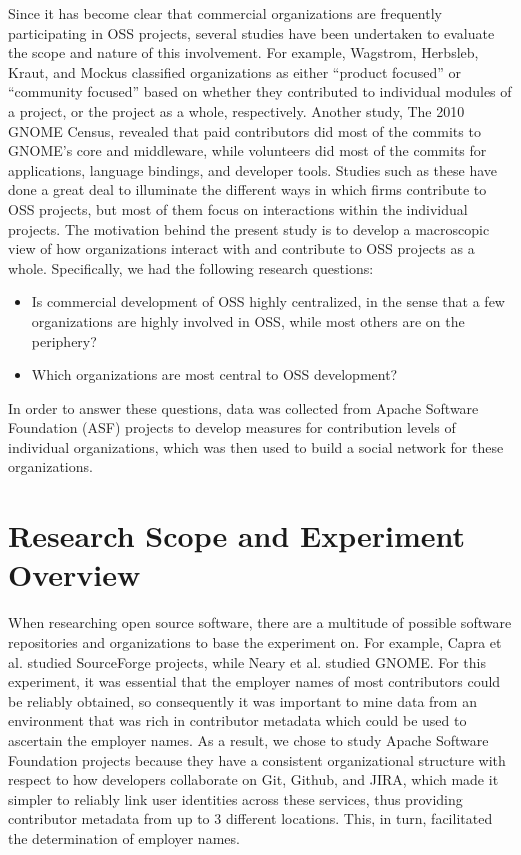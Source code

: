 Since it has become clear that commercial organizations are frequently participating in OSS projects, several studies have been undertaken to evaluate the scope and nature of this involvement. For example, Wagstrom, Herbsleb, Kraut, and Mockus \cite{wagstrom2010impact} classified organizations as either ``product focused'' or ``community focused'' based on whether they contributed to individual modules of a project, or the project as a whole, respectively. Another study, The 2010 GNOME Census\cite{neary2010gnome}, revealed that paid contributors did most of the commits to GNOME's core and middleware, while volunteers did most of the commits for applications, language bindings, and developer tools. Studies such as these have done a great deal to illuminate the different ways in which firms contribute to OSS projects, but most of them focus on interactions within the individual projects. The motivation behind the present study is to develop a macroscopic view of how organizations interact with and contribute to OSS projects as a whole. Specifically, we had the following research questions:
\begin{itemize}
	\item Is commercial development of OSS highly centralized, in the sense that a few organizations are highly involved in OSS, while most others are on the periphery?
	\item Which organizations are most central to OSS development?
\end{itemize}
In order to answer these questions, data was collected from Apache Software Foundation (ASF) projects to develop measures for contribution levels of individual organizations, which was then used to build a social network for these organizations.

\section{Research Scope and Experiment Overview}
When researching open source software, there are a multitude of possible software repositories and organizations to base the experiment on. For example, Capra et al. studied SourceForge projects, while Neary et al. studied GNOME. 
 
For this experiment, it was essential that the employer names of most contributors could be reliably obtained, so consequently it was important to mine data from an environment that was rich in contributor metadata which could be used to ascertain the employer names. As a result, we chose to study Apache Software Foundation projects because they have a consistent organizational structure with respect to how developers collaborate on Git, Github, and JIRA, which made it simpler to reliably link user identities across these services, thus providing contributor metadata from up to 3 different locations. This, in turn, facilitated the determination of employer names.

